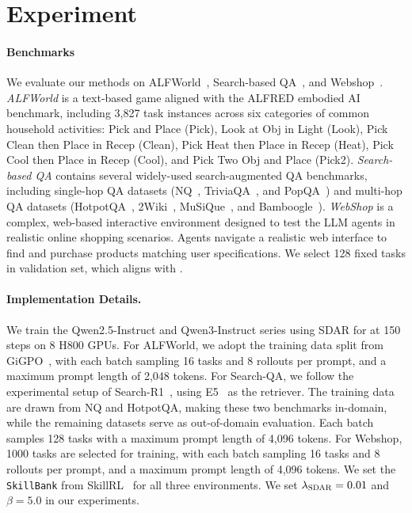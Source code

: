 \documentclass{article} %
\newcommand{\methodname}{\textsc{SDAR}\xspace}
\begin{document}


\section{Experiment}
\paragraph{Benchmarks}

We evaluate our methods on ALFWorld~\citep{shridhar2020alfworld}, Search-based QA~\citep{jin2025searchr1}, and Webshop~\citep{yao2022webshop}. \textit{ALFWorld} is a text-based game aligned with the ALFRED embodied AI benchmark, including 3,827 task instances across six categories of common household activities: Pick and Place (Pick), Look at Obj in Light (Look), Pick Clean then Place in Recep (Clean), Pick Heat then Place in Recep (Heat), Pick Cool then Place in Recep (Cool), and Pick Two Obj and Place (Pick2). \textit{Search-based QA} contains several widely-used search-augmented QA benchmarks, including single-hop QA datasets (NQ~\citep{kwiatkowski2019nq}, TriviaQA~\citep{joshi2017triviaqa}, and PopQA~\citep{mallen2023popqa}) and multi-hop QA datasets (HotpotQA~\citep{yang2018hotpotqa}, 2Wiki~\citep{ho20202wiki}, MuSiQue~\citep{trivedi2022musique}, and Bamboogle~\citep{press2023bamboogle}).
\textit{WebShop} is a complex, web-based interactive environment designed to test the LLM agents in realistic online shopping scenarios. Agents navigate a realistic web interface to find and purchase products matching user specifications. We select 128 fixed tasks in validation set, which aligns with \citet{feng2025gigpo}.

\paragraph{Implementation Details.}
We train the Qwen2.5-Instruct and Qwen3-Instruct series using \methodname{} for at 150 steps on 8 H800 GPUs.
For ALFWorld, we adopt the training data split from GiGPO~\citep{feng2025gigpo}, 
with each batch sampling 16 tasks and 8 rollouts per prompt, 
and a maximum prompt length of 2,048 tokens.
For Search-QA, we follow the experimental setup of Search-R1~\citep{jin2025searchr1}, 
using E5~\citep{wang2022e5} as the retriever.
The training data are drawn from NQ and HotpotQA, making these two benchmarks in-domain, 
while the remaining datasets serve as out-of-domain evaluation.
Each batch samples 128 tasks with a maximum prompt length of 4,096 tokens. For Webshop, 1000 tasks are selected for training, with each batch sampling 16 tasks and 8 rollouts per prompt, and a maximum prompt length of 4,096 tokens. 
We set the \texttt{SkillBank} from SkillRL~\citep{xia2026skillrl} for all three environments. We set $\lambda_{\methodname}=0.01$ and $\beta=5.0$ in our experiments.
\end{document}
